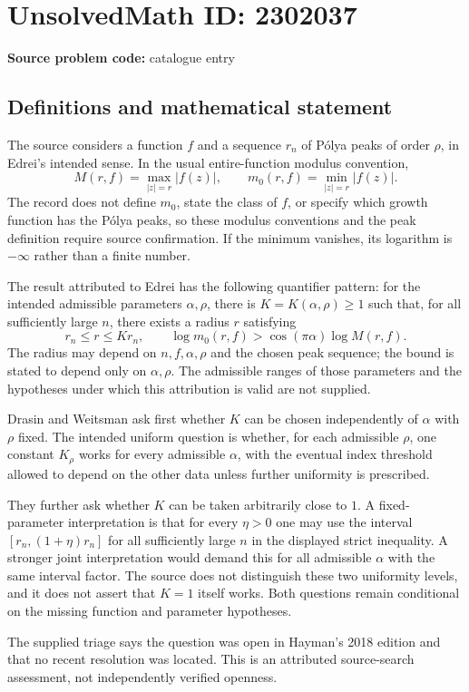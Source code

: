 \documentclass[11pt]{article}
\begin{document}
\section*{UnsolvedMath ID: 2302037}
\textbf{Source problem code:} catalogue entry
\subsection{Definitions and mathematical statement}
The source considers a function $f$ and a sequence $r_n$ of P\'olya peaks of order $\rho$, in Edrei's intended sense. In the usual entire-function modulus convention,
\[
M(r,f)=\max_{|z|=r}|f(z)|,\qquad
m_0(r,f)=\min_{|z|=r}|f(z)|.
\]
The record does not define $m_0$, state the class of $f$, or specify which growth function has the P\'olya peaks, so these modulus conventions and the peak definition require source confirmation. If the minimum vanishes, its logarithm is $-\infty$ rather than a finite number.

The result attributed to Edrei has the following quantifier pattern: for the intended admissible parameters $\alpha,\rho$, there is $K=K(\alpha,\rho)\ge1$ such that, for all sufficiently large $n$, there exists a radius $r$ satisfying
\[
r_n\le r\le Kr_n,\qquad
\log m_0(r,f)>\cos(\pi\alpha)\log M(r,f).
\]
The radius may depend on $n,f,\alpha,\rho$ and the chosen peak sequence; the bound is stated to depend only on $\alpha,\rho$. The admissible ranges of those parameters and the hypotheses under which this attribution is valid are not supplied.

Drasin and Weitsman ask first whether $K$ can be chosen independently of $\alpha$ with $\rho$ fixed. The intended uniform question is whether, for each admissible $\rho$, one constant $K_\rho$ works for every admissible $\alpha$, with the eventual index threshold allowed to depend on the other data unless further uniformity is prescribed.

They further ask whether $K$ can be taken arbitrarily close to $1$. A fixed-parameter interpretation is that for every $\eta>0$ one may use the interval $[r_n,(1+\eta)r_n]$ for all sufficiently large $n$ in the displayed strict inequality. A stronger joint interpretation would demand this for all admissible $\alpha$ with the same interval factor. The source does not distinguish these two uniformity levels, and it does not assert that $K=1$ itself works. Both questions remain conditional on the missing function and parameter hypotheses.

The supplied triage says the question was open in Hayman's 2018 edition and that no recent resolution was located. This is an attributed source-search assessment, not independently verified openness.
\end{document}
